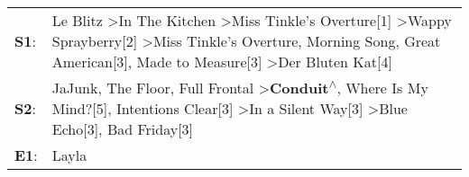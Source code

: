 \begin{supertabular}{p{0.03\textwidth}p{0.92\textwidth}}
 \textbf{S1}:  &  Le Blitz\textsuperscript{} \textgreater \enspace In The Kitchen\textsuperscript{} \textgreater \enspace Miss Tinkle's Overture[1]\textsuperscript{} \textgreater \enspace Wappy Sprayberry[2]\textsuperscript{} \textgreater \enspace Miss Tinkle's Overture\textsuperscript{}, \enspace Morning Song\textsuperscript{}, \enspace Great American[3]\textsuperscript{}, \enspace Made to Measure[3]\textsuperscript{} \textgreater \enspace Der Bluten Kat[4]\textsuperscript{}  \enspace  \\
 \textbf{S2}:  &                                             JaJunk\textsuperscript{}, \enspace The Floor\textsuperscript{}, \enspace Full Frontal\textsuperscript{} \textgreater \enspace \textbf{Conduit\textsuperscript{$\wedge$}}, \enspace Where Is My Mind?[5]\textsuperscript{}, \enspace Intentions Clear[3]\textsuperscript{} \textgreater \enspace In a Silent Way[3]\textsuperscript{} \textgreater \enspace Blue Echo[3]\textsuperscript{}, \enspace Bad Friday[3]\textsuperscript{}  \enspace  \\
 \textbf{E1}:  &                                                                                                                                                                                                                                                                                                                                                                                                                                                         Layla\textsuperscript{}  \enspace  \\
\end{supertabular}
